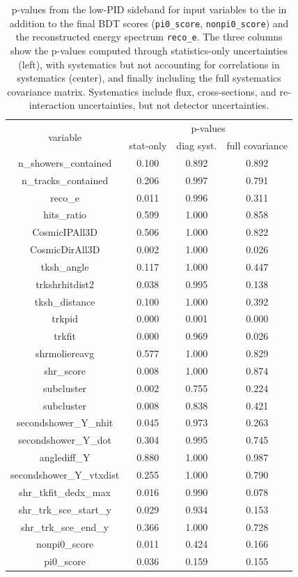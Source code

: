 \begin{table}[H]
\centering
\setlength{\tabcolsep}{10pt}
\renewcommand{\arraystretch}{1.25}
\begin{tabular}{| c | c | c | c | } 
 \hline
\multirow{2}{*}{variable} & \multicolumn{3}{c|}{p-values} \\
\cline{2-4} & stat-only & diag syst. & full covariance \\ \hline
n\_showers\_contained & 0.100 & 0.892 & 0.892 \\ \hline
n\_tracks\_contained & 0.206 & 0.997 & 0.791 \\ \hline
reco\_e & 0.011 & 0.996 & 0.311 \\ \hline
hits\_ratio & 0.599 & 1.000 & 0.858 \\ \hline
CosmicIPAll3D & 0.506 & 1.000 & 0.822 \\ \hline
CosmicDirAll3D & 0.002 & 1.000 & 0.026 \\ \hline
tksh\_angle & 0.117 & 1.000 & 0.447 \\ \hline
trkshrhitdist2 & 0.038 & 0.995 & 0.138 \\ \hline
tksh\_distance & 0.100 & 1.000 & 0.392 \\ \hline
trkpid & 0.000 & 0.001 & 0.000 \\ \hline
trkfit & 0.000 & 0.969 & 0.026 \\ \hline
shrmoliereavg & 0.577 & 1.000 & 0.829 \\ \hline
shr\_score & 0.008 & 1.000 & 0.874 \\ \hline
subcluster & 0.002 & 0.755 & 0.224 \\ \hline
subcluster & 0.008 & 0.838 & 0.421 \\ \hline
secondshower\_Y\_nhit & 0.045 & 0.973 & 0.263 \\ \hline
secondshower\_Y\_dot & 0.304 & 0.995 & 0.745 \\ \hline
anglediff\_Y & 0.880 & 1.000 & 0.987 \\ \hline
secondshower\_Y\_vtxdist & 0.255 & 1.000 & 0.790 \\ \hline
shr\_tkfit\_dedx\_max & 0.016 & 0.990 & 0.078 \\ \hline
shr\_trk\_sce\_start\_y & 0.029 & 0.934 & 0.153 \\ \hline
shr\_trk\_sce\_end\_y & 0.366 & 1.000 & 0.728 \\ \hline
nonpi0\_score & 0.011 & 0.424 & 0.166 \\ \hline
pi0\_score & 0.036 & 0.159 & 0.155 \\ \hline

 \end{tabular}
 \caption{\label{tab:LOWPIDppvalues}p-values from the low-PID \npsel sideband for input variables to the \npsel in addition to the final BDT scores (\texttt{pi0\_score}, \texttt{nonpi0\_score}) and the reconstructed energy spectrum \texttt{reco\_e}. The three columns show the p-values computed through statistics-only uncertainties (left), with systematics but not accounting for correlations in systematics (center), and finally including the full systematics covariance matrix. Systematics include flux, cross-sections, and re-interaction uncertainties, but not detector uncertainties.}
\end{table}


